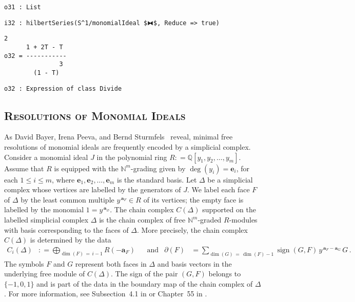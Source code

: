 \documentclass[12pt,leqno]{amsart}
\theoremstyle{definition}
\newcommand{\colequal}{\ensuremath{:\!=}}
\begin{document}
\begin{lstlisting}[xleftmargin=10pt, aboveskip=1.5pt, belowskip=1.5pt]
o31 : List
\end{lstlisting}
\begin{lstlisting}[xleftmargin=10pt, aboveskip=1.5pt, belowskip=1.5pt]
i32 : hilbertSeries(S^1/monomialIdeal $⧓$, Reduce => true)
\end{lstlisting}
\begin{lstlisting}[xleftmargin=10pt, lineskip=-10pt, aboveskip=4pt, belowskip=1pt]
                2
      1 + 2T - T
o32 = -----------
               3
        (1 - T)
\end{lstlisting}
\begin{lstlisting}[xleftmargin=10pt, aboveskip=1.5pt, belowskip=-5.0pt]
o32 : Expression of class Divide
\end{lstlisting}


\subsection*{\scshape\mdseries Resolutions of Monomial Ideals}

As David Bayer, Irena Peeva, and Bernd Sturmfels~\cite{BPS} reveal, minimal
free resolutions of monomial ideals are frequently encoded by a simplicial
complex.  Consider a monomial ideal $J$ in the polynomial ring
$R \colequal \mathbb{Q}[y_1, y_2, \dotsc, y_m]$.  Assume that $R$ is equipped
with the $\mathbb{N}^{m}$-grading given by $\deg(y_i) = \textbf{e}_i$, for each
$1 \leqslant i \leqslant m$, where
$\textbf{e}_1, \textbf{e}_2, \dotsc, \textbf{e}_m$ is the standard basis.
Let $\Delta$ be a simplicial complex whose vertices are labelled by the generators
of $J$.  We label each face $F$ of $\Delta$ by the least common multiple
$y^{\,\textbf{a}_{\!F}} \in R$ of its vertices; the empty face is labelled by
the monomial $1 = y^{\,\textbf{a}_{\!\varnothing}}$.  The chain complex
$C(\Delta)$ supported on the labelled simplicial complex $\Delta$ is the chain
complex of free $\mathbb{N}^m$-graded $R$-modules with basis corresponding to
the faces of $\Delta$. More precisely, the chain complex $C(\Delta)$ is determined
by the data
\begin{align*}
  C_i(\Delta)
  &\colequal \bigoplus_{\dim(F) \,=\, i-1} R(-\textbf{a}_F) 
  & & \text{and}
  &\partial(F)
  &= \sum_{\dim(G) \,=\, \dim(F)-1} \operatorname{sign}(G,F) \,
    y^{\,\textbf{a}_{\!F} - \textbf{a}_{\!G}} \, G \, .
\end{align*}
The symbols $F$ and $G$ represent both faces in $\Delta$ and basis vectors in
the underlying free module of $C(\Delta)$.  The sign of the pair $(G,F)$
belongs to $\{-1,0,1\}$ and is part of the data in the boundary map of the
chain complex of $\Delta$.  For more information, see Subsection~4.1 in
\cite{MS} or Chapter~55 in \cite{Peeva}.
\end{document}
